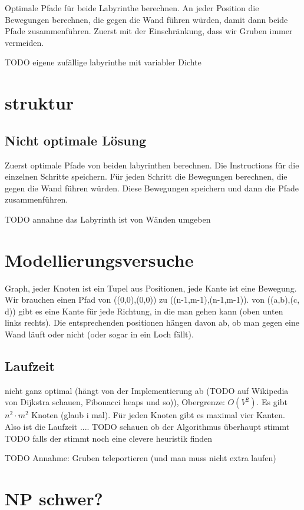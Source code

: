 \documentclass[11pt]{article}
\begin{document}
   Optimale Pfade für beide Labyrinthe berechnen.
    An jeder Position die Bewegungen berechnen, die gegen die Wand führen würden,
    damit dann beide Pfade zusammenführen.
    Zuerst mit der Einschränkung, dass wir Gruben immer vermeiden.

    TODO eigene zufällige labyrinthe mit variabler Dichte

\section{struktur}
    \subsection{Nicht optimale Lösung}
    Zuerst optimale Pfade von beiden labyrinthen berechnen.
    Die Instructions für die einzelnen Schritte speichern. Für jeden Schritt die Bewegungen berechnen, die gegen die
    Wand führen würden. Diese Bewegungen speichern und dann die Pfade zusammenführen.

    TODO annahne das Labyrinth ist von Wänden umgeben

    \section{Modellierungsversuche}
    Graph, jeder Knoten ist ein Tupel aus Positionen, jede Kante ist eine Bewegung.
Wir brauchen einen Pfad von ((0,0),(0,0)) zu ((n-1,m-1),(n-1,m-1)).
von ((a,b),(c, d)) gibt es eine Kante für jede Richtung, in die man gehen kann (oben unten links rechts). Die
    entsprechenden positionen hängen davon ab, ob man gegen eine Wand läuft oder nicht (oder sogar in ein Loch fällt).

\subsection{Laufzeit}
nicht ganz optimal (hängt von der Implementierung ab (TODO auf Wikipedia  von Dijkstra schauen, Fibonacci heaps und
so)),
Obergrenze: $O(V^2)$. Es gibt $n^2 \cdot m^2$ Knoten (glaub i mal). Für jeden Knoten gibt es maximal vier Kanten.
Also ist die Laufzeit ....
TODO schauen ob der Algorithmus überhaupt stimmt
TODO falls der stimmt noch eine clevere heuristik finden


TODO Annahme: Gruben teleportieren (und man muss nicht extra laufen)


    \section{NP schwer?}
\end{document}
